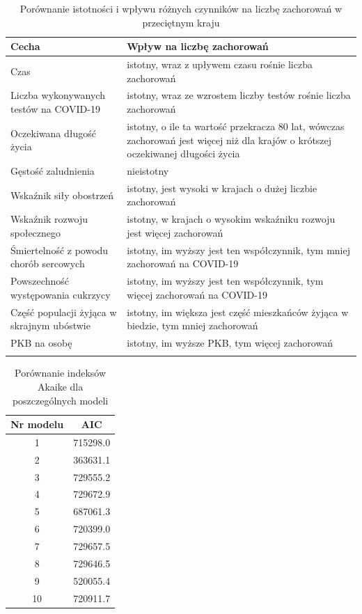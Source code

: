 \documentclass[12pt]{mwbk}
\theoremstyle{plain}
\theoremstyle{definition}
\theoremstyle{remark}
\begin{document}
\begin{longtable}{| p{} | p{} |}
	\hline
	Cecha & Wpływ na liczbę zachorowań \\ \hline 
	Czas & istotny, wraz z upływem czasu rośnie liczba zachorowań \\ \hline
	Liczba wykonywanych testów na COVID-19 & istotny, wraz ze wzrostem liczby testów rośnie liczba zachorowań \\ \hline
	Oczekiwana długość życia & istotny, o ile ta wartość przekracza 80 lat, wówczas zachorowań jest więcej niż dla krajów o krótszej oczekiwanej długości życia \\ \hline 
	Gęstość zaludnienia & nieistotny \\ \hline
	Wskaźnik siły obostrzeń & istotny, jest wysoki w krajach o dużej liczbie zachorowań \\ \hline
	Wskaźnik rozwoju społecznego & istotny, w krajach o wysokim wskaźniku rozwoju jest więcej zachorowań \\ \hline
	Śmiertelność z powodu chorób sercowych & istotny, im wyższy jest ten współczynnik, tym mniej zachorowań na COVID-19 \\ \hline
	Powszechność występowania cukrzycy & istotny, im wyższy jest ten współczynnik, tym więcej zachorowań na COVID-19 \\ \hline
	Część populacji żyjąca w skrajnym ubóstwie & istotny, im większa jest część mieszkańców żyjąca w biedzie, tym mniej zachorowań \\ \hline
	PKB na osobę & istotny, im wyższe PKB, tym więcej zachorowań \\ \hline
	\caption{Porównanie istotności i wpływu różnych czynników na liczbę zachorowań w przeciętnym kraju}
	\label{tab:istotnosc}
	\end{longtable}

\begin{table}
	\centering
	\begin{tabular}{|c|c|}
		\hline 
		Nr modelu&   AIC \\ \hline
		1 &  715298.0  \\ \hline
		2 &  363631.1  \\ \hline
		3 &   729555.2  \\ \hline
		4 &   729672.9  \\ \hline
		5 &   687061.3  \\ \hline
		6 &   720399.0  \\ \hline
		7 &   729657.5  \\ \hline
		8 &   729646.5 \\ \hline
		9 &   520055.4 \\ \hline
		10&   720911.7 \\ \hline
	\end{tabular}
\caption{Porównanie indeksów Akaike dla poszczególnych modeli}
\label{tab:akaike}
\end{table}
\end{document}
